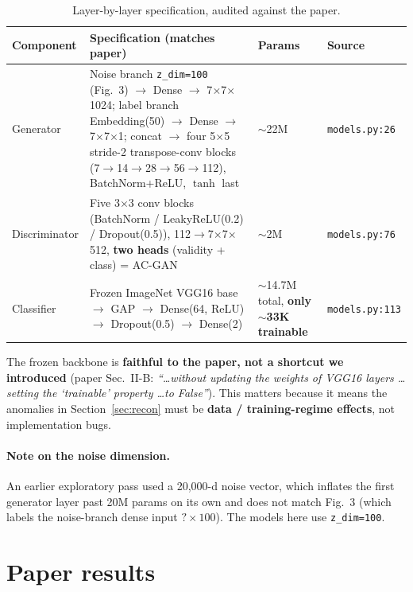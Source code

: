\documentclass[11pt]{article}
\newcommand{\code}[1]{\texttt{#1}}
\begin{document}
\begin{table}[htbp]
\centering\small
\caption{Layer-by-layer specification, audited against the paper.}
\label{tab:faithful}
\begin{tabular}{@{}p{2.1cm}p{8.1cm}p{1.4cm}p{2.4cm}@{}}
\toprule
\textbf{Component} & \textbf{Specification (matches paper)} & \textbf{Params} & \textbf{Source} \\
\midrule
Generator & Noise branch \code{z\_dim=100} (Fig.~3) $\rightarrow$ Dense $\rightarrow$ 7$\times$7$\times$1024; label branch Embedding(50) $\rightarrow$ Dense $\rightarrow$ 7$\times$7$\times$1; concat $\rightarrow$ four 5$\times$5 stride-2 transpose-conv blocks (7$\to$14$\to$28$\to$56$\to$112), BatchNorm+ReLU, $\tanh$ last & $\sim$22M & \code{models.py:26} \\
\addlinespace
Discriminator & Five 3$\times$3 conv blocks (BatchNorm / LeakyReLU(0.2) / Dropout(0.5)), 112$\to$7$\times$7$\times$512, \textbf{two heads} (validity + class) = AC-GAN & $\sim$2M & \code{models.py:76} \\
\addlinespace
Classifier & Frozen ImageNet VGG16 base $\rightarrow$ GAP $\rightarrow$ Dense(64, ReLU) $\rightarrow$ Dropout(0.5) $\rightarrow$ Dense(2) & $\sim$14.7M total, \textbf{only $\sim$33K trainable} & \code{models.py:113} \\
\bottomrule
\end{tabular}
\end{table}

The frozen backbone is \textbf{faithful to the paper, not a shortcut we
introduced} (paper Sec.~II-B: \emph{``\ldots without updating the weights of VGG16
layers \ldots setting the `trainable' property \ldots to False''}). This matters
because it means the anomalies in Section~\ref{sec:recon} must be \textbf{data /
training-regime effects}, not implementation bugs.

\paragraph{Note on the noise dimension.} An earlier exploratory pass used a
20{,}000-d noise vector, which inflates the first generator layer past 20M params
on its own and does not match Fig.~3 (which labels the noise-branch dense input
$?{\times}100$). The models here use \code{z\_dim=100}.

\section{Paper results}
\end{document}
